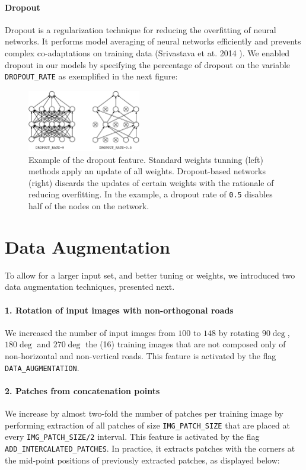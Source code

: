 \documentclass[fleqn,9 pt]{SelfArx} %
\begin{document}
\begin{sloppypar}
\paragraph{Dropout}

Dropout is a regularization technique for reducing the overfitting of neural networks. It performs model averaging of neural networks efficiently and prevents complex co-adaptations on training data (Srivastava et at. 2014 \cite{srivastava2014dropout}). We enabled dropout in our models by specifying the percentage of dropout on the variable \texttt{DROPOUT\_RATE} as exemplified in the next figure:

\begin{figure}[H]
\centering
\includegraphics[width=0.44\textwidth]{figures/DROPOUT_RATE.pdf}
\caption{Example of the dropout feature. Standard weights tunning (left) methods apply an update of all weights. Dropout-based networks (right) discards the updates of certain weights with the rationale of reducing overfitting. In the example, a dropout rate of \texttt{0.5} disables half of the nodes on the network.}
\end{figure}


\section{Data Augmentation}
\label{sec-data-augmentation}

To allow for a larger input set, and better tuning or weights, we introduced two data augmentation techniques, presented next.

\paragraph{1. Rotation of input images with non-orthogonal roads} We increased the number of input images from $100$ to $148$ by rotating $90 \deg$, $180 \deg$ and $270 \deg$ the (16) training images that are not composed only of non-horizontal and non-vertical roads. This feature is activated by the flag \texttt{DATA\_AUGMENTATION}.

\paragraph{2. Patches from concatenation points} We increase by almost two-fold the number of patches per training image by performing extraction of all patches of size \texttt{IMG\_PATCH\_SIZE} that are placed at every \texttt{IMG\_PATCH\_SIZE/2} interval. This feature is activated by the flag \texttt{ADD\_INTERCALATED\_PATCHES}. In practice, it extracts patches with the corners at the mid-point positions of previously extracted patches, as displayed below:


\end{sloppypar}
\end{document}
